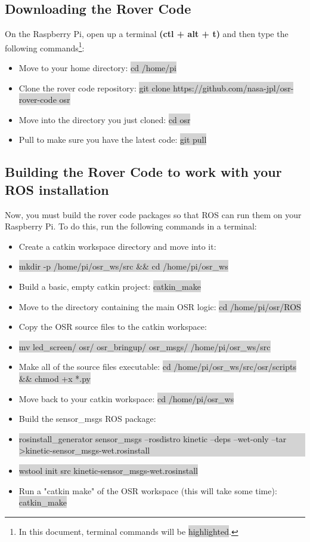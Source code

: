 \documentclass{article}
\begin{document}
\subsection{Downloading the Rover Code}
On the Raspberry Pi, open up a terminal \textbf{(ctl + alt + t)} and then type the following commands\footnote{In this document, terminal commands will be \colorbox{lightgray}{highlighted}.}:

\begin{itemize}
	\item[] Move to your home directory: \colorbox{lightgray}{cd /home/pi}
	\item[] Clone the rover code repository: \colorbox{lightgray}{git clone https://github.com/nasa-jpl/osr-rover-code osr}
	\item[] Move into the directory you just cloned: \colorbox{lightgray}{cd osr}
	\item[] Pull to make sure you have the latest code: \colorbox{lightgray}{git pull}
\end{itemize}

\subsection{Building the Rover Code to work with your ROS installation}
Now, you must build the rover code packages so that ROS can run them on your Raspberry Pi.  To do this, run the following commands in a terminal:

\begin{itemize}
	\item[] Create a catkin workspace directory and move into it:
	\item[] \colorbox{lightgray}{mkdir -p /home/pi/osr\_ws/src \&\& cd /home/pi/osr\_ws}
	\item[] Build a basic, empty catkin project: \colorbox{lightgray}{catkin\_make}
	\item[] Move to the directory containing the main OSR logic: \colorbox{lightgray}{cd /home/pi/osr/ROS}
	\item[] Copy the OSR source files to the catkin workspace:
	\item[] \colorbox{lightgray}{mv led\_screen/ osr/ osr\_bringup/ osr\_msgs/ /home/pi/osr\_ws/src}
	\item[] Make all of the source files executable:  \colorbox{lightgray}{cd /home/pi/osr\_ws/src/osr/scripts \&\& chmod +x *.py}
	\item[] Move back to your catkin workspace: \colorbox{lightgray}{cd /home/pi/osr\_ws}
	\item[] Build the sensor\_msgs ROS package:
	\item[] \colorbox{lightgray}{\parbox{0.9\textwidth}{rosinstall\_generator sensor\_msgs --rosdistro kinetic --deps --wet-only --tar \textgreater kinetic-sensor\_msgs-wet.rosinstall}}
	\item[] \colorbox{lightgray}{wstool init src kinetic-sensor\_msgs-wet.rosinstall}
	\item[] Run a "catkin make" of the OSR workspace (this will take some time): \colorbox{lightgray}{catkin\_make}
\end{itemize}
\end{document}
